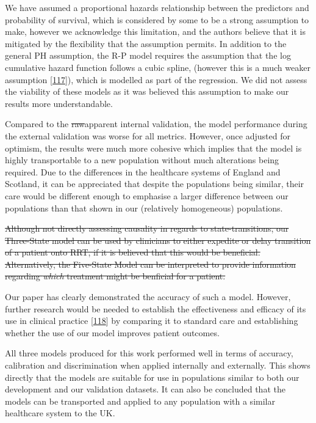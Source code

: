 \documentclass[12pt,PhD,twoside,openright]{muthesis}
\begin{document}
We have assumed a proportional hazards relationship between the predictors and probability of survival, which is considered by some to be a strong assumption to make, however we acknowledge this limitation, and the authors believe that it is mitigated by the flexibility that the assumption permits. In addition to the general PH assumption, the R-P model requires the assumption that the log cumulative hazard function follows a cubic spline, (however this is a much weaker assumption {[}\protect\hyperlink{ref-royston_flexible_2002}{117}{]}), which is modelled as part of the regression. We did not assess the viability of these models as it was believed this assumption to make our results more understandable.

Compared to the \sout{raw}apparent internal validation, the model performance during the external validation was worse for all metrics. However, once adjusted for optimism, the results were much more cohesive which implies that the model is highly transportable to a new population without much alterations being required. Due to the differences in the healthcare systems of England and Scotland, it can be appreciated that despite the populations being similar, their care would be different enough to emphasise a larger difference between our populations than that shown in our (relatively homogeneous) populations.

\sout{Although not directly assessing causality in regards to state-transitions, our Three-State model can be used by clinicians to either expedite or delay transition of a patient onto RRT, if it is believed that this would be beneficial. Alternatively, the Five-State Model can be interpreted to provide information regarding \emph{which} treatment might be benficial for a patient.}

Our paper has clearly demonstrated the accuracy of such a model. However, further research would be needed to establish the effectiveness and efficacy of its use in clinical practice {[}\protect\hyperlink{ref-moons_prognosis_2009-1}{118}{]} by comparing it to standard care and establishing whether the use of our model improves patient outcomes.

All three models produced for this work performed well in terms of accuracy, calibration and discrimination when applied internally and externally. This shows directly that the models are suitable for use in populations similar to both our development and our validation datasets. It can also be concluded that the models can be transported and applied to any population with a similar healthcare system to the UK.
\end{document}
